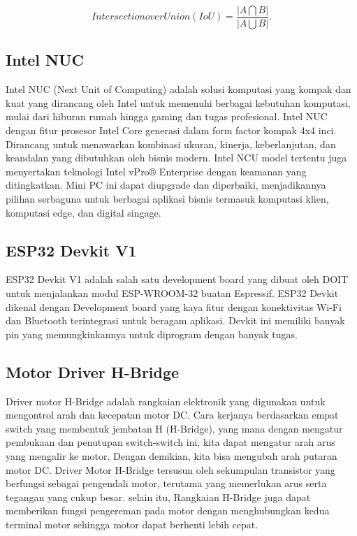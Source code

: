 \begin{equation}
IntersectionoverUnion(IoU) = \frac{\left |A\bigcap B  \right |}{\left | A\bigcup B \right |}.
\end{equation}

\subsection{Intel NUC}
Intel NUC (Next Unit of Computing) adalah solusi komputasi yang kompak dan kuat yang dirancang oleh Intel untuk memenuhi berbagai kebutuhan komputasi, mulai dari hiburan rumah hingga gaming dan tugas profesional. Intel NUC dengan fitur prosesor Intel Core generasi dalam form factor kompak 4x4 inci. Dirancang untuk menawarkan kombinasi ukuran, kinerja, keberlanjutan, dan keandalan yang dibutuhkan oleh bisnis modern. Intel NCU model tertentu juga menyertakan teknologi Intel vPro® Enterprise dengan keamanan yang ditingkatkan. Mini PC ini dapat diupgrade dan diperbaiki, menjadikannya pilihan serbaguna untuk berbagai aplikasi bisnis termasuk komputasi klien, komputasi edge, dan digital singage.


\subsection{ESP32 Devkit V1}

ESP32 Devkit V1 adalah salah satu development board yang dibuat oleh DOIT untuk menjalankan modul ESP-WROOM-32 buatan Espressif. ESP32 Devkit dikenal dengan Development board yang kaya fitur dengan konektivitas Wi-Fi dan Bluetooth terintegrasi untuk beragam aplikasi. Devkit ini memiliki banyak pin yang memungkinkannya untuk diprogram dengan banyak tugas.

\subsection{Motor Driver H-Bridge}

Driver motor H-Bridge adalah rangkaian elektronik yang digunakan untuk mengontrol arah dan kecepatan motor DC. Cara kerjanya berdasarkan empat switch yang membentuk jembatan H (H-Bridge), yang mana dengan mengatur pembukaan dan penutupan switch-switch ini, kita dapat mengatur arah arus yang mengalir ke motor. Dengan demikian, kita bisa mengubah arah putaran motor DC. Driver Motor H-Bridge tersusun oleh sekumpulan transistor yang berfungsi sebagai pengendali motor, terutama yang memerlukan arus serta tegangan yang cukup besar. selain itu, Rangkaian H-Bridge juga dapat memberikan fungsi pengereman pada motor dengan menghubungkan kedua terminal motor sehingga motor dapat berhenti lebih cepat. \cite{fibrianianalisis}

